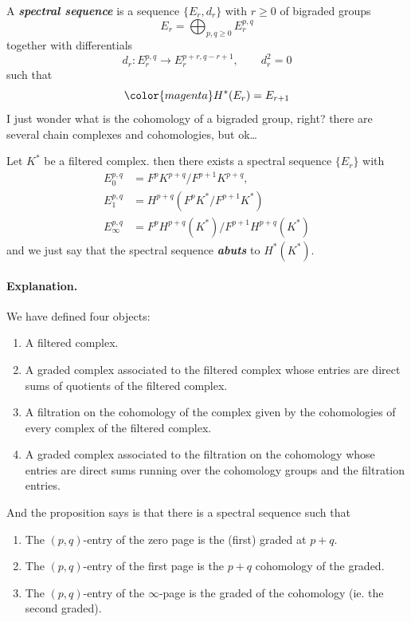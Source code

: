 \begin{remark}
\begin{defn}
\begin{defn}
	A \textit{\textbf{spectral sequence}} is a sequence $\{E_r,d_r\}$ with $r\geq 0$ of bigraded groups
	\[E_r=\bigoplus_{p,q\geq 0} E^{p,q}_r \]
together with differentials
\[d_r:E^{p,q}_r\to E^{p+r,q-r+1}_r,\qquad d^2_r=0\]
such that
\[{\color{magenta}H^{*}(E_r)=E_{r+1}}\]
{\color{magenta}I just wonder what is the cohomology of a bigraded group, right? there are several chain complexes and cohomologies, but ok…}
\end{defn}

\begin{prop}
	Let $K^*$ be a filtered complex. then there exists a spectral sequence $\{E_r\}$ with
	\begin{align*}
		E^{p,q}_0&=F^pK^{p+q}/F^{p+1}K^{p+q},\\
		E^{p,q}_1&=H^{p+q}\left( F^pK^*/F^{p+1}K^* \right)\\
		E^{p,q}_\infty&=F^pH^{p+q}(K^*)\big/F^{p+1}H^{p+q}(K^*)
	\end{align*}
and we just say that the spectral sequence \textit{\textbf{abuts}} to $H^{*}(K^*)$.
\end{prop}

\paragraph{Explanation.} We have defined four objects:
\begin{enumerate}
	\item A filtered complex.
	\item A graded complex associated to the filtered complex whose entries are direct sums of quotients of the filtered complex.
	\item A filtration on the cohomology of the complex given by the cohomologies of every complex of the filtered complex.
	\item A graded complex associated to the filtration on the cohomology whose entries are direct sums running over the cohomology groups and the filtration entries.
\end{enumerate}
And the proposition says is that there is a spectral sequence such that
\begin{enumerate}
	\item The $(p,q)$-entry of the zero page is the (first) graded at $p+q$.
	\item The $(p,q)$-entry of the first page is the $p+q$ cohomology of the graded.
	\item The $(p,q)$-entry of the $\infty$-page is the graded of the cohomology
 (ie. the second graded).
\end{enumerate}


\end{defn}
\end{remark}
